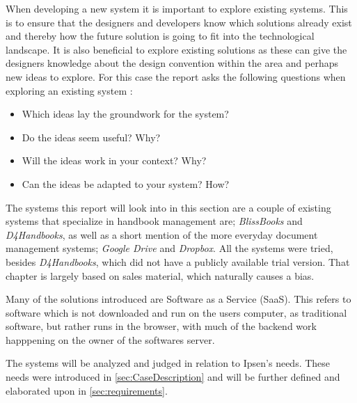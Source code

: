When developing a new system it is important to explore existing systems.
This is to ensure that the designers and developers know which solutions already exist and thereby how the future solution is going to fit into the technological landscape.
It is also beneficial to explore existing solutions as these can give the designers knowledge about the design convention within the area and perhaps new ideas to explore.
For this case the report asks the following questions when exploring an existing system \citep[p.~33]{Rod-Aalborg}:

\begin{itemize}
  \item Which ideas lay the groundwork for the system?
  \item Do the ideas seem useful? Why?
  \item Will the ideas work in your context? Why?
  \item Can the ideas be adapted to your system? How?
\end{itemize}

The systems this report will look into in this section are a couple of existing systems that specialize in handbook management are; \textit{BlissBooks} and \textit{D4Handbooks}, as well as a short mention of the more everyday document management systems; \textit{Google Drive} and \textit{Dropbox}. All the systems were tried, besides \textit{D4Handbooks}, which did not have a publicly available trial version. That chapter is largely based on sales material, which naturally causes a bias.

Many of the solutions introduced are Software as a Service (SaaS). This refers to software which is not downloaded and run on the users computer, as traditional software, but rather runs in the browser, with much of the backend work happpening on the owner of the softwares server.

The systems will be analyzed and judged in relation to Ipsen's needs.
These needs were introduced in \ref{sec:CaseDescription} and will be further defined and elaborated upon in \ref{sec:requirements}.